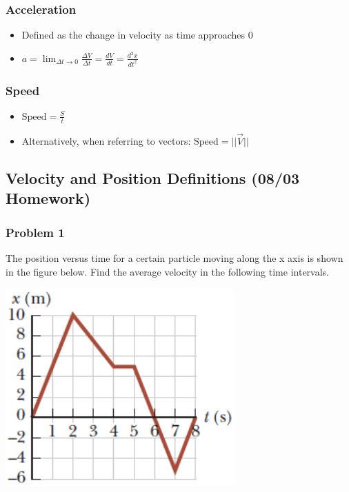 \documentclass[
  letterpaper,
  DIV=11,
  numbers=noendperiod]{scrartcl}
\providecommand{\tightlist}{%
  \setlength{\itemsep}{0pt}\setlength{\parskip}{0pt}}\usepackage{longtable,booktabs,array}
\begin{document}
\hypertarget{acceleration}{%
\subsubsection{Acceleration}\label{acceleration}}

\begin{itemize}
\tightlist
\item
  Defined as the change in velocity as time approaches 0
\item
  \(a = \lim_{\Delta t \to 0} \frac{\Delta V}{\Delta t} = \frac{dV}{dt} = \frac{d^2x}{dt^2}\)
\end{itemize}

\hypertarget{speed}{%
\subsubsection{Speed}\label{speed}}

\begin{itemize}
\tightlist
\item
  \(\text{Speed} = \frac{S}{t}\)
\item
  Alternatively, when referring to vectors:
  \(\text{Speed} = ||\vec{V}||\)
\end{itemize}

\hypertarget{velocity-and-position-definitions-0803-homework}{%
\subsection{Velocity and Position Definitions (08/03
Homework)}\label{velocity-and-position-definitions-0803-homework}}

\hypertarget{problem-1}{%
\subsubsection{Problem 1}\label{problem-1}}

The position versus time for a certain particle moving along the x axis
is shown in the figure below. Find the average velocity in the following
time intervals.

\includegraphics{img/Kinematics Velocity and Position HW/problem1.png}
\end{document}
